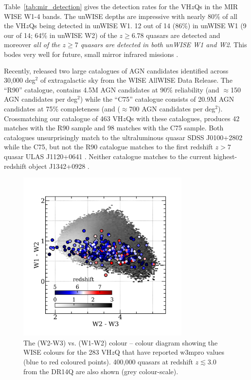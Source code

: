\documentclass[usenatbib]{mnras}
\begin{document}
Table~\ref{tab:mir_detection} gives the detection rates for the
VH$z$Qs in the MIR WISE W1-4 bands. The unWISE depths are impressive
with nearly 80\% of all the VH$z$Qs being detected in unWISE W1. 12
out of 14 (86\%) in unWISE W1 (9 our of 14; 64\% in unWISE W2) of the
$z\geq6.78$ quasars are detected and moreover {\it all of the $z\geq7$
quasars are detected in both unWISE W1 and W2}. This bodes very well
for future, small mirror infrared missions \citep[e.g.][]{NEOCam_WP}.

Recently, \citet{Assef2018} released two large catalogues of AGN
candidates identified across 30,000 deg$^2$ of extragalactic sky from
the WISE AllWISE Data Release. The ``R90'' catalogue, contains 4.5M
AGN candidates at 90\% reliability (and $\approx$150 AGN candidates
per deg$^2$) while the ``C75'' catalogue consists of 20.9M AGN
candidates at 75\% completeness (and ($\approx$700 AGN candidates per
deg$^2$). Crossmatching our catalogue of 463 VH$z$Qs with these
catalogues, produces 42 matches with the R90 sample and 98 matches
with the C75 sample. Both catalogues unsurprisingly match to the
ultraluminous quasar SDSS J0100+2802 \citep{Wu2015} while the C75, but
not the R90 catalogue matches to the first redshift $z>7$ quasar ULAS
J1120+0641 \citep{Mortlock2011}. Neither catalogue matches to the
current highest-redshift object J1342+0928 \citep{Banados2018}.


\begin{figure}
    \centering
    \includegraphics[width=8.6cm,  clip, trim=6mm 4mm 6mm 10mm]
    {../color_color/W1W2_plots/W1W2W3/W1W2W3_hexplots_20190610v2.png} 
  \vspace{-14pt}
    \caption{The (W2-W3) vs. (W1-W2) colour – colour diagram showing the WISE colours 
      for the 283 VH$z$Q that have reported w3mpro values (blue to red coloured points).
      400,000 quasars at redshift $z\lesssim3.0$ from the DR14Q are also shown
      (grey colour-scale). }
    \label{fig:W1W2W3}
\end{figure}
\end{document}
